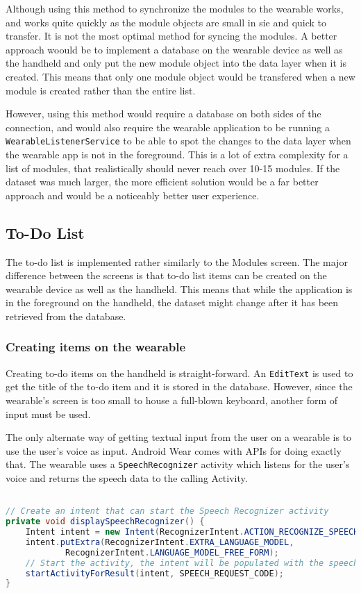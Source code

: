 Although using this method to synchronize the modules to the wearable works,
and works quite quickly as the module objects are small in sie and quick to
transfer. It is not the most optimal method for syncing the modules. A better
approach woould be to implement a database on the wearable device as well as the
handheld and only put the new module object into the data layer when it is
created. This means that only one module object would be transfered when a new
module is created rather than the entire list.

However, using this method would require a database on both sides of the
connection, and would also require the wearable application to be running a
\texttt{WearableListenerService} to be able to spot the changes to the data
layer when the wearable app is not in the foreground. This is a lot of extra
complexity for a list of modules, that realistically should never reach over
10-15 modules. If the dataset was much larger, the more efficient solution
would be a far better approach and would be a noticeably better user experience.

\subsection{To-Do List}
The to-do list is implemented rather similarly to the Modules screen. The major
difference between the screens is that to-do list items can be created on the
wearable device as well as the handheld. This means that while the application
is in the foreground on the handheld, the dataset might change after it has been
retrieved from the database.

\subsubsection{Creating items on the wearable}
Creating to-do items on the handheld is straight-forward. An \texttt{EditText}
is used to get the title of the to-do item and it is stored in the database.
However, since the wearable's screen is too small to house a full-blown
keyboard, another form of input must be used.

The only alternate way of getting textual input from the user on a wearable is
to use the user's voice as input. Android Wear comes with APIs for doing exactly
that. The wearable uses a \texttt{SpeechRecognizer} activity which listens for
the user's voice and returns the speech data to the calling Activity.

\begin{lstlisting}[language=Java]

// Create an intent that can start the Speech Recognizer activity
private void displaySpeechRecognizer() {
    Intent intent = new Intent(RecognizerIntent.ACTION_RECOGNIZE_SPEECH);
    intent.putExtra(RecognizerIntent.EXTRA_LANGUAGE_MODEL,
            RecognizerIntent.LANGUAGE_MODEL_FREE_FORM);
    // Start the activity, the intent will be populated with the speech text
    startActivityForResult(intent, SPEECH_REQUEST_CODE);
}

\end{lstlisting}

